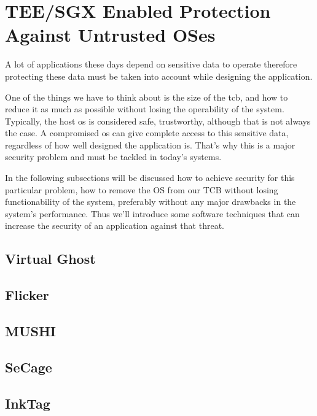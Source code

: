 
\section{TEE/SGX Enabled Protection Against Untrusted OSes} %
\label{sec:tee_enabled_frameworks}

A lot of applications these days depend on sensitive data to operate therefore protecting these data must be taken into account while designing the application. 

One of the things we have to think about is the size of the \gls{tcb}, and how to reduce it as much as possible without losing the operability of the system. Typically, the host \gls{os} is considered safe, trustworthy, although that is not always the case. A compromised \gls{os} can give complete access to this sensitive data, regardless of how well designed the application is. That's why this is a major security problem and must be tackled in today's systems. 

In the following subsections will be discussed how to achieve security for this particular problem, how to remove the OS from our TCB without losing functionability of the system, preferably without any major drawbacks in the system's performance. Thus we'll introduce some software techniques that can increase the security of an application against that threat.

\subsection{Virtual Ghost}
\label{ssec:virtghost}

\subsection{Flicker}
\label{ssec:flicker}


\subsection{MUSHI}
\label{ssec:mushi}


\subsection{SeCage}
\label{ssec:secage}



\subsection{InkTag}
\label{ssec:inktag}




